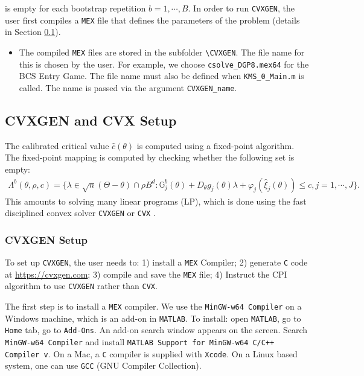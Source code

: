 \documentclass[12pt]{article}
\def\code#1{\texttt{#1}}
\begin{document}
is empty for each bootstrap repetition $b = 1,\cdots,B$.  In order to run \code{CVXGEN}, the user first compiles a  \code{MEX} file that defines the parameters of the problem (details in Section \ref{subsec:cvxgen}).
\begin{itemize}
\item The compiled \code{MEX} files are stored in the subfolder \code{\textbackslash CVXGEN}.  The file name for this is chosen by the user.  For example, we choose \code{csolve\_DGP8.mex64} for the BCS Entry Game.  The file name must also be defined when  \code{KMS\_0\_Main.m} is called.  The name is passed via the argument \code{CVXGEN\_name}.
\end{itemize}

\subsection{CVXGEN and CVX Setup}\label{subsec:cvxgen}
The calibrated critical value $\hat c(\theta)$ is computed using a fixed-point algorithm.  The fixed-point mapping is computed by checking whether the following set is empty:
\begin{align}\label{eq:lambda}
\Lambda^b(\theta,\rho,c) = \{ \lambda \in \sqrt{n}(\Theta-\theta) \cap \rho B^d : \mathbb{G}^b_{j}(\theta) +  D_{\theta}g_j(\theta)\lambda + \varphi_j(\hat \xi_{j}(\theta)) \leq c, j = 1,\cdots,J\}.
\end{align}
This amounts to solving many linear programs (LP), which is done using the fast disciplined convex solver \code{CVXGEN} \cite{mattingley2012cvxgen} or \code{CVX} \cite{cvx,gb08}.

\subsubsection{CVXGEN Setup}
To set up \code{CVXGEN}, the user needs to: 1) install a \code{MEX} Compiler; 2) generate \code{C} code at  \url{https://cvxgen.com};   3) compile and save the \code{MEX} file; 4) Instruct the CPI algorithm to use \code{CVXGEN} rather than \code{CVX}.

The first step is to install a \code{MEX} compiler.  We use the \code{MinGW-w64 Compiler} on a Windows machine, which is an add-on in \code{MATLAB}.  To install: open \code{MATLAB}, go to \code{Home} tab, go to \code{Add-Ons}.  An add-on search window appears on the screen.  Search \code{MinGW-w64 Compiler} and install \code{MATLAB Support for MinGW-w64 C/C++ Compiler v}. On a Mac, a \code{C} compiler is supplied with \code{Xcode}.  On a Linux based system, one can use \code{GCC} (GNU Compiler Collection).
\end{document}
